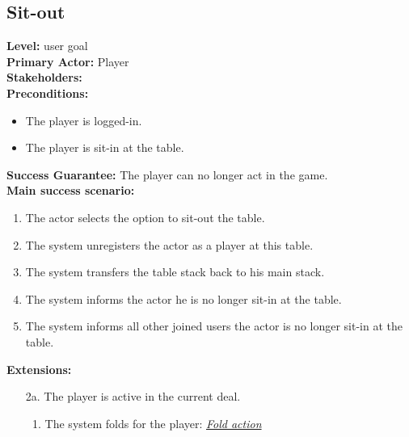 \documentclass[a4paper,11pt]{report}
\begin{document}
\subsection{Sit-out}
\textbf{Level:} user goal \\
\textbf{Primary Actor:} Player \\
\textbf{Stakeholders:} \\
\textbf{Preconditions:}
\begin{itemize}
\item The player is logged-in.
\item The player is sit-in at the table.
\end{itemize}
\textbf{Success Guarantee:} The player can no longer act in the game.\\
\textbf{Main success scenario:} 
\begin{enumerate}
\item The actor selects the option to sit-out the table.
\item The system unregisters the actor as a player at this table. 
\item The system transfers the table stack back to his main stack. 
\item The system informs the actor he is no longer sit-in at the table. 
\item The system informs all other joined users the actor is no longer sit-in at the table.
\end{enumerate}
\textbf{Extensions:}
\begin{itemize}
\item[2a.] The player is active in the current deal.
\begin{enumerate}
\item The system folds for the player: \emph{\underline{Fold action}}
\end{enumerate}
\end{itemize}
\end{document}
